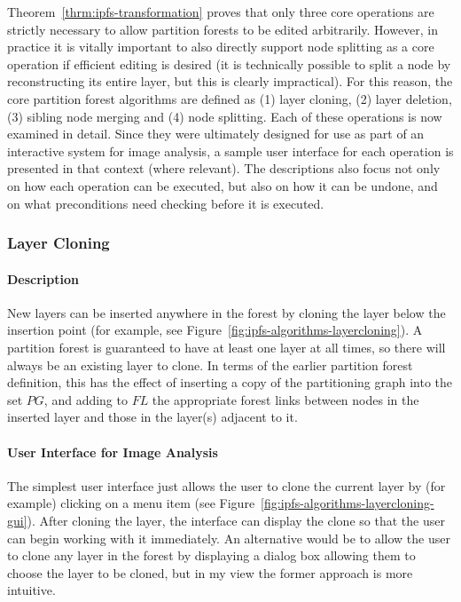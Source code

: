 \noindent Theorem~\ref{thrm:ipfs-transformation} proves that only three core operations are strictly necessary to allow partition forests to be edited arbitrarily. However, in practice it is vitally important to also directly support node splitting as a core operation if efficient editing is desired (it is technically possible to split a node by reconstructing its entire layer, but this is clearly impractical). For this reason, the core partition forest algorithms are defined as (1) layer cloning, (2) layer deletion, (3) sibling node merging and (4) node splitting. Each of these operations is now examined in detail. Since they were ultimately designed for use as part of an interactive system for image analysis, a sample user interface for each operation is presented in that context (where relevant). The descriptions also focus not only on how each operation can be executed, but also on how it can be undone, and on what preconditions need checking before it is executed.

\subsubsection{Layer Cloning}

\paragraph{Description}

New layers can be inserted anywhere in the forest by cloning the layer below the insertion point (for example, see Figure~\ref{fig:ipfs-algorithms-layercloning}). A partition forest is guaranteed to have at least one layer at all times, so there will always be an existing layer to clone. In terms of the earlier partition forest definition, this has the effect of inserting a copy of the partitioning graph into the set $\textit{PG}$, and adding to $\textit{FL}$ the appropriate forest links between nodes in the inserted layer and those in the layer(s) adjacent to it.

\paragraph{User Interface for Image Analysis}

The simplest user interface just allows the user to clone the current layer by (for example) clicking on a menu item (see Figure~\ref{fig:ipfs-algorithms-layercloning-gui}). After cloning the layer, the interface can display the clone so that the user can begin working with it immediately. An alternative would be to allow the user to clone any layer in the forest by displaying a dialog box allowing them to choose the layer to be cloned, but in my view the former approach is more intuitive.

